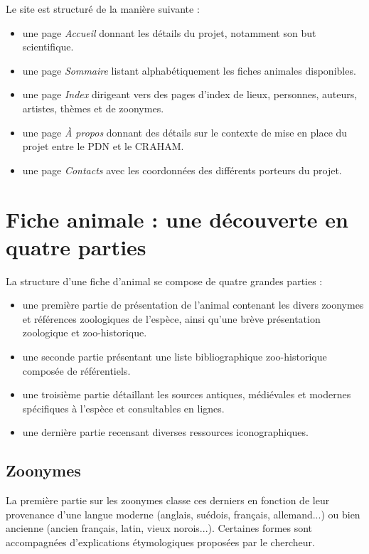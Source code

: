 \documentclass[a4paper,12pt,twoside]{book}
\begin{document}
Le site est structuré de la manière suivante :

\begin{itemize}
    \item une page \textit{Accueil} donnant les détails du projet, notamment son but scientifique.
    \item une page \textit{Sommaire} listant alphabétiquement les fiches animales disponibles.
    \item une page \textit{Index} dirigeant vers des pages d'index de lieux, personnes, auteurs, artistes, thèmes et de zoonymes.
    \item une page \textit{À propos} donnant des détails sur le contexte de mise en place du projet entre le \acrshort{PDN} et le \acrshort{CRAHAM}.
    \item une page \textit{Contacts} avec les coordonnées des différents porteurs du projet.
\end{itemize}


\section{Fiche animale : une découverte en quatre parties}

La structure d'une fiche d'animal se compose de quatre grandes parties : 

\begin{itemize}
    \item une première partie de présentation de l'animal contenant les divers zoonymes et références zoologiques de l'espèce, ainsi qu'une brève présentation zoologique et zoo-historique.
    \item une seconde partie présentant une liste bibliographique zoo-historique composée de référentiels.
    \item une troisième partie détaillant les sources antiques, médiévales et modernes spécifiques à l'espèce et consultables en lignes.
    \item une dernière partie recensant diverses ressources iconographiques.
\end{itemize}

\subsection{Zoonymes}
La première partie sur les zoonymes classe ces derniers en fonction de leur provenance d'une langue moderne (anglais, suédois, français, allemand...) ou bien ancienne (ancien français, latin, vieux norois...). Certaines formes sont accompagnées d'explications étymologiques proposées par le chercheur.
\end{document}
